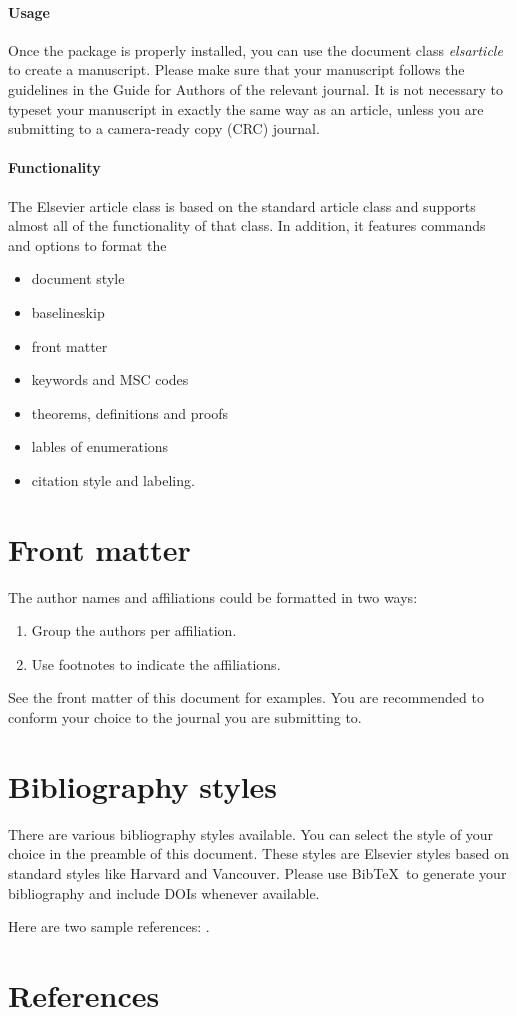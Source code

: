 \documentclass[review]{elsarticle}
\begin{document}
\paragraph{Usage} Once the package is properly installed, you can use the document class \emph{elsarticle} to create a manuscript. Please make sure that your manuscript follows the guidelines in the Guide for Authors of the relevant journal. It is not necessary to typeset your manuscript in exactly the same way as an article, unless you are submitting to a camera-ready copy (CRC) journal.

\paragraph{Functionality} The Elsevier article class is based on the standard article class and supports almost all of the functionality of that class. In addition, it features commands and options to format the
\begin{itemize}
\item document style
\item baselineskip
\item front matter
\item keywords and MSC codes
\item theorems, definitions and proofs
\item lables of enumerations
\item citation style and labeling.
\end{itemize}

\section{Front matter}

The author names and affiliations could be formatted in two ways:
\begin{enumerate}[(1)]
\item Group the authors per affiliation.
\item Use footnotes to indicate the affiliations.
\end{enumerate}
See the front matter of this document for examples. You are recommended to conform your choice to the journal you are submitting to.

\section{Bibliography styles}

There are various bibliography styles available. You can select the style of your choice in the preamble of this document. These styles are Elsevier styles based on standard styles like Harvard and Vancouver. Please use Bib\TeX\ to generate your bibliography and include DOIs whenever available.

Here are two sample references: \cite{Feynman1963118,Dirac1953888}.

\section*{References}


\end{document}
